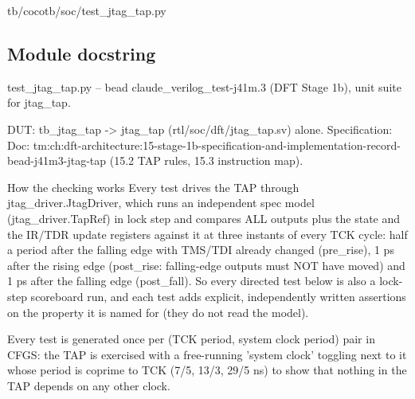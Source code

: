 \begin{relocated}{tb/cocotb/soc/test_jtag_tap.py}

\subsection*{Module docstring}

\begin{textblock}
test_jtag_tap.py -- bead claude_verilog_test-j41m.3 (DFT Stage 1b), unit suite for jtag_tap.

DUT: tb_jtag_tap -> jtag_tap (rtl/soc/dft/jtag_tap.sv) alone.
Specification: Doc: tm:ch:dft-architecture:15-stage-1b-specification-and-implementation-record-bead-j41m3-jtag-tap (15.2 TAP rules, 15.3 instruction map).

How the checking works
Every test drives the TAP through jtag_driver.JtagDriver, which runs an independent spec model
(jtag_driver.TapRef) in lock step and compares ALL outputs plus the state and the IR/TDR update
registers against it at three instants of every TCK cycle: half a period after the falling edge
with TMS/TDI already changed (pre_rise), 1 ps after the rising edge (post_rise: falling-edge
outputs must NOT have moved) and 1 ps after the falling edge (post_fall).  So every directed
test below is also a lock-step scoreboard run, and each test adds explicit, independently
written assertions on the property it is named for (they do not read the model).

Every test is generated once per (TCK period, system clock period) pair in CFGS: the TAP is
exercised with a free-running 'system clock' toggling next to it whose period is coprime to TCK
(7/5, 13/3, 29/5 ns) to show that nothing in the TAP depends on any other clock.


\end{textblock}
\end{relocated}
